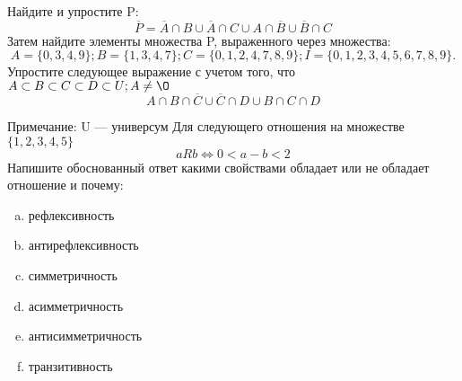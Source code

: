 \documentclass[10pt]{exam}
\begin{document}
\begin{questions}
\question
Найдите и упростите P:
\begin{equation*}
\overline{P} = \overline{A} \cap B \cup \overline{A} \cap C \cup A \cap \overline{B} \cup \overline{B} \cap C
\end{equation*}
Затем найдите элементы множества P, выраженного через множества:
\begin{equation*}
A = \{0, 3, 4, 9\}; 
B = \{1, 3, 4, 7\};
C = \{0, 1, 2, 4, 7, 8, 9\};
I = \{0, 1, 2, 3, 4, 5, 6, 7, 8, 9\}.
\end{equation*}\question
Упростите следующее выражение с учетом того, что $A\subset B \subset C \subset D \subset U; A \neq \O$
\begin{equation*}
A \cap B  \cap \overline{C} \cup \overline{C} \cap D \cup B \cap C \cap D
\end{equation*}

Примечание: U — универсум\question
Для следующего отношения на множестве $\{1, 2, 3, 4, 5\}$ 
\begin{equation*}
aRb \iff 0 < a-b<2
\end{equation*}
Напишите обоснованный ответ какими свойствами обладает или не обладает отношение и почему:   
\begin{enumerate} [a)]\setcounter{enumi}{0}
\item рефлексивность
\item антирефлексивность
\item симметричность
\item асимметричность
\item антисимметричность
\item транзитивность
\end{enumerate}


\end{questions}
\end{document}
